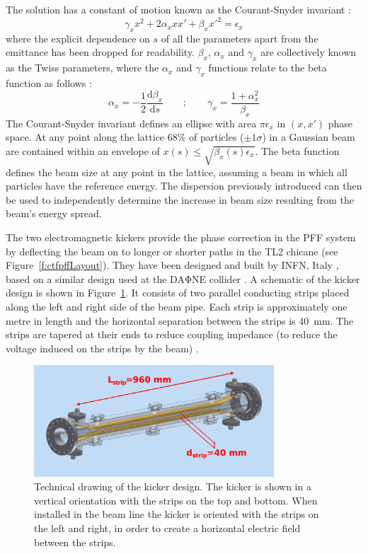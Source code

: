 The solution has a constant of motion known as the Courant-Snyder invariant \cite{courant}:
\begin{equation}
\gamma_x x^2 + 2\alpha_x x x' + \beta_x x'^2 = \epsilon_x 
\end{equation}
where the explicit dependence on \(s\) of all the parameters apart from the emittance has been dropped for readability. \(\beta_{x}\), \(\alpha_{x}\) and \(\gamma_{x}\) are collectively known as the Twiss parameters, where the \(\alpha_x\) and \(\gamma_x\) functions relate to the beta function as follows \cite{wilson}:
\begin{equation}
\alpha_x = -\frac{1}{2}\frac{\mathrm{d}\beta_x}{\mathrm{d}s}
\qquad\mathrm{;}\qquad
\gamma_x = \frac{1+\alpha_x^2}{\beta_x}
\label{e:twissEqAlpha}
\end{equation}
The Courant-Snyder invariant defines an ellipse with area \(\pi\epsilon_x\) in \((x, x')\) phase space. At any point along the lattice 68\% of particles (\(\pm 1\sigma\)) in a Gaussian beam are contained within an envelope of \(x(s) \leq \sqrt{\beta_x(s)\epsilon_x}\). The beta function defines the beam size at any point in the lattice, assuming a beam in which all particles have the reference energy. The dispersion previously introduced can then be used to independently determine the increase in beam size resulting from the beam's energy spread.


The two electromagnetic kickers provide the phase correction in the PFF system by deflecting the beam on to longer or shorter paths in the TL2 chicane (see Figure~\ref{f:ctfpffLayout}). They have been designed and built by INFN, Italy \cite{infn}, based on a similar design used at the DA\(\mathrm{\Phi}\)NE collider \cite{dafneKick}. A schematic of the kicker design is shown in Figure~\ref{f:kickerSchematic}. It consists of two parallel conducting strips placed along the left and right side of the beam pipe. Each strip is approximately one metre in length and the horizontal separation between the strips is 40~mm. The strips are tapered at their ends to reduce coupling impedance (to reduce the voltage induced on the strips by the beam) \cite{kickerIPAC11}.

\begin{figure}
  \centering
  \includegraphics[width=0.8\textwidth]{Figures/optics/kickerSchematic}
  \caption{Technical drawing of the kicker design. The kicker is shown in a vertical orientation with the strips on the top and bottom. When installed in the beam line the kicker is oriented with the strips on the left and right, in order to create a horizontal electric field between the strips.}
  \label{f:kickerSchematic}
\end{figure}

